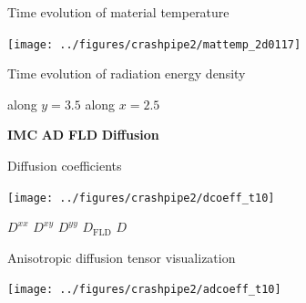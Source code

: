 \documentclass{beamer}
\begin{document}
\begin{frame}{Time evolution of material temperature}
\begin{center}
  \texttt{[image: ../figures/crashpipe2/mattemp\_2d0117]}
\end{center}
\end{frame}
\begin{frame}{Time evolution of radiation energy density}
  
\begin{center}
  along $y=3.5$ \qquad
  \qquad along $x=2.5$

  \textcolor[rgb]{0,0,0}{\textbf{IMC}}\quad
  \textcolor[rgb]{0.1,0.9,0.1}{\textbf{AD}}\quad
  \textcolor[rgb]{0,0,1}{\textbf{FLD}}\quad
  \textcolor[rgb]{1,0,0}{\textbf{Diffusion}}
\end{center}
\end{frame}
\begin{frame}{Diffusion coefficients}
\begin{center}
  \texttt{[image: ../figures/crashpipe2/dcoeff\_t10]}

\textcolor[rgb]{0,0,0}{$D^{xx}$}\quad
\textcolor[rgb]{1,.3,.3}{$D^{xy}$}\quad
\textcolor[rgb]{0.1,0.9,0.1}{$D^{yy}$}\quad
\textcolor[rgb]{0,0,1}{$D_\text{FLD}$}\quad
  \textcolor[rgb]{1,0,0}{$D$}
\end{center}
\end{frame}
\begin{frame}{Anisotropic diffusion tensor visualization}
\begin{center}
  \texttt{[image: ../figures/crashpipe2/adcoeff\_t10]}
\end{center}
\end{frame}
\end{document}
